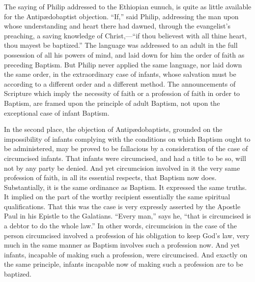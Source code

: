 \documentclass[]{book}
\begin{document}
The saying of Philip addressed to the Ethiopian eunuch, is quite as little available for the Antipædobaptist objection. ``If,'' said Philip, addressing the man upon whose understanding and heart there had dawned, through the evangelist's preaching, a saving knowledge of Christ,---``if thou believest with all thine heart, thou mayest be baptized.'' The language was addressed to an adult in the full possession of all his powers of mind, and laid down for him the order of faith as preceding Baptism. But Philip never applied the same language, nor laid down the same order, in the extraordinary case of infants, whose salvation must be according to a different order and a different method. The announcements of Scripture which imply the necessity of faith or a profession of faith in order to Baptism, are framed upon the principle of adult Baptism, not upon the exceptional case of infant Baptism.

In the second place, the objection of Antipædobaptists, grounded on the impossibility of infants complying with the conditions on which Baptism ought to be administered, may be proved to be fallacious by a consideration of the case of circumcised infants. That infants were circumcised, and had a title to be so, will not by any party be denied. And yet circumcision involved in it the very same profession of faith, in all its essential respects, that Baptism now does. Substantially, it is the same ordinance as Baptism. It expressed the same truths. It implied on the part of the worthy recipient essentially the same spiritual qualifications. That this was the case is very expressly asserted by the Apostle Paul in his Epistle to the Galatians. ``Every man,'' says he, ``that is circumcised is a debtor to do the whole law.'' In other words, circumcision in the case of the person circumcised involved a profession of his obligation to keep God's law, very much in the same manner as Baptism involves such a profession now. And yet infants, incapable of making such a profession, were circumcised. And exactly on the same principle, infants incapable now of making such a profession are to be baptized.
\end{document}
